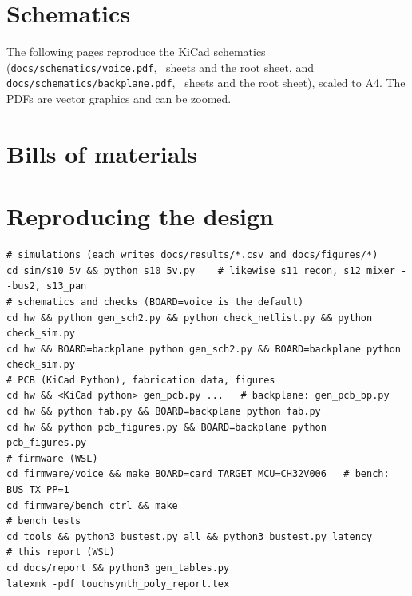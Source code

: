 \documentclass[11pt,a4paper]{article}
\newcommand{\file}[1]{\texttt{#1}}
\begin{document}
\section{Schematics}\label{app:sch}
The following pages reproduce the KiCad schematics (\file{docs/schematics/voice.pdf}, \statVoiceSheets\ sheets and
the root sheet, and \file{docs/schematics/backplane.pdf}, \statBpSheets\ sheets and the root sheet), scaled to A4. The
PDFs are vector graphics and can be zoomed.




\section{Bills of materials}\label{app:bom}
{\small}
{\small}
{\small}
{\small}

\section{Reproducing the design}
\begin{footnotesize}
\begin{verbatim}
# simulations (each writes docs/results/*.csv and docs/figures/*)
cd sim/s10_5v && python s10_5v.py    # likewise s11_recon, s12_mixer --bus2, s13_pan
# schematics and checks (BOARD=voice is the default)
cd hw && python gen_sch2.py && python check_netlist.py && python check_sim.py
cd hw && BOARD=backplane python gen_sch2.py && BOARD=backplane python check_sim.py
# PCB (KiCad Python), fabrication data, figures
cd hw && <KiCad python> gen_pcb.py ...   # backplane: gen_pcb_bp.py
cd hw && python fab.py && BOARD=backplane python fab.py
cd hw && python pcb_figures.py && BOARD=backplane python pcb_figures.py
# firmware (WSL)
cd firmware/voice && make BOARD=card TARGET_MCU=CH32V006   # bench: BUS_TX_PP=1
cd firmware/bench_ctrl && make
# bench tests
cd tools && python3 bustest.py all && python3 bustest.py latency
# this report (WSL)
cd docs/report && python3 gen_tables.py
latexmk -pdf touchsynth_poly_report.tex
\end{verbatim}
\end{footnotesize}
\end{document}
